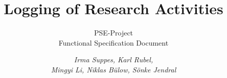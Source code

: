 \documentclass[parskip=full, 12pt, oneside]{scrbook}
\author{
	\textit{Irma Suppes, Karl Rubel, } \\ 
	\textit{Mingyi Li, Niklas Bülow, Sönke Jendral }
}
\title{Logging of Research Activities}
\subtitle{PSE-Project \\ Functional Specification Document}
\begin{document}
\newcommand{\requirementscope}[2]{\newcounter{counter#1}\expandafter\def\csname #2\endcsname{\addtocounter{counter#1}{10}\item[#1\arabic{counter#1}\phantomsection\label{#1\arabic{counter#1}}]}}
\newcommand{\specref}[1]{\hyperref[#1]{#1}}

\maketitle

\tableofcontents
\printnoidxglossaries
\end{document}
